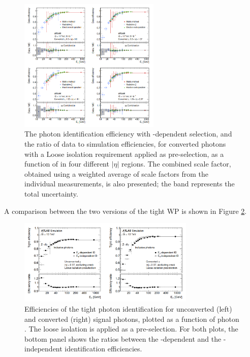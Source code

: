 \begin{figure}[htbp]
    \centering
    \includegraphics[width=0.6\textwidth]{Ch3/Img/Converted_Eff_2017.png}
    \caption{The photon identification efficiency with \eT-dependent selection, and the ratio of data to simulation efficiencies, for converted photons with a Loose isolation requirement applied as pre-selection, as a function of \eT in four different $|\eta|$ regions. The combined scale factor, obtained using a weighted average of scale factors from the individual measurements, is also presented; the band represents the total uncertainty.}
    \label{fig:gamma:ID:Eff:Cov}
\end{figure}
A comparison between the two versions of the tight WP is shown in Figure \ref{fig:gamma:ID:Eff:Tight}.
\begin{figure}[htbp]
    \centering
    \includegraphics[width=0.75\textwidth]{Ch3/Img/Tight_ID.png}
    \caption{Efficiencies of the tight photon identification for unconverted (left) and converted (right) signal photons, plotted as a function of photon \eT. The loose isolation is applied as a pre-selection. For both plots, the bottom panel shows the ratios between the \eT-dependent and the \eT-independent identification efficiencies.}
    \label{fig:gamma:ID:Eff:Tight}
\end{figure}

